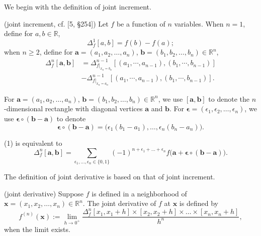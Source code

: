 \documentclass{ijclclp}
\begin{document}
We begin with the definition of joint increment. 

\begin{definition}{(joint increment, cf. [5, \S 254])} 
    Let \(f\) be a function of $n$ variables. When \(n=1\), define for $a, b\in\mathbb R$, 
    \[\Delta^1_{f}[a,b]=f(b)-f(a);\]
    when \(n\ge 2\), define for \(\boldsymbol{a}=(a_{1},a_{2},\dots,a_{n})\), 
    \(\boldsymbol{b}=(b_{1},b_{2},\dots,b_{n})\in\mathbb R^n\), 
    \begin{equation}
        \begin{aligned}
            \Delta_{f}^{n}[\boldsymbol{a},\boldsymbol{b}]&=\Delta_{f|_{x_n=b_n}}^{n-1}[(a_{1},\cdots, a_{n-1}),(b_{1},\cdots,b_{n-1})]\\
            &-\Delta_{f|_{x_n=a_n}}^{n-1}[(a_{1},\cdots, a_{n-1}),(b_{1},\cdots,b_{n-1})].            
        \end{aligned}
    \end{equation}
\end{definition}
\begin{sign}
    For \(\boldsymbol{a}=(a_{1},a_{2},\dots,a_{n})\), 
    \(\boldsymbol{b}=(b_{1},b_{2},\dots,b_{n})\in\mathbb R^n\), we use \([\boldsymbol{a},\boldsymbol{b}]\) to denote the $n$-dimensional rectangle with diagonal vertices $\boldsymbol{a}$ and $\boldsymbol{b}$. For \(\boldsymbol{\epsilon}=(\epsilon_{1},\epsilon_{2},\dots,\epsilon_{n})\), we use \(\boldsymbol{\epsilon}\circ(\boldsymbol{b}-\boldsymbol{a})\) to denote 
    \[\boldsymbol{\epsilon}\circ(\boldsymbol{b}-\boldsymbol{a})=\big(\epsilon_1(b_1-a_1),\dots,\epsilon_n(b_n-a_n)\big).\]
\end{sign} 
\begin{remark}
     (1) is equivalent to
     \begin{equation}
         \Delta_{f}^{n}[\boldsymbol{a},\boldsymbol{b}]=\sum_{\epsilon_1,\dots,\epsilon_n\in\{0,1\}}(-1)^{n+\epsilon_1+\dots+\epsilon_n}f\big(\boldsymbol{a}+\boldsymbol{\epsilon}\circ(\boldsymbol{b}-\boldsymbol{a})\big).
     \end{equation}
\end{remark}

The definition of joint derivative is based on that of joint increment. 

\begin{definition}{(joint derivative)}
    Suppose \(f\) is defined in a neighborhood of \(\boldsymbol{x}=(x_1, x_2, \dots, x_n)\in\mathbb R^n\). The joint derivative of \(f\) at \(\boldsymbol{x}\) is defined by 
    \[f^{(n)}(\boldsymbol{x}):=\lim_{h\to 0^+}\frac{\Delta_{f}^{n}[x_1,x_1+h]\times[x_2,x_2+h]\times\dots\times[x_n,x_n+h]}{h^n},\]
    when the limit exists. \\[-0.5em]
\end{definition}
\end{document}
